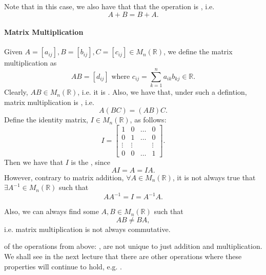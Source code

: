 \documentclass[notoc,notitlepage]{tufte-book}
\begin{document}
Note that in this case, we also have that that the operation is , i.e.
\begin{equation*}
  A + B = B + A.
\end{equation*}

\paragraph{Matrix Multiplication} Given $A = [a_{ij}], B = [b_{ij}], C = [c_{ij}] \in M_n(\mathbb{R})$, we define the matrix multiplication as
\begin{equation*}
  AB = [d_{ij}] \text{ where } c_{ij} = \sum_{k=1}^{n} a_{ik} b_{kj} \in \mathbb{R}.
\end{equation*}
Clearly, $AB \in M_n(\mathbb{R})$, i.e. it is . Also, we have that, under such a defintion, matrix multiplication is , i.e.
\begin{equation*}
  A(BC) = (AB)C.
\end{equation*}
Define the identity matrix, $I \in M_n(\mathbb{R})$, as follows:
\begin{equation*}
  I = \begin{bmatrix}
    1      &   0    & \hdots & 0 \\
    0      &   1    & \hdots & 0 \\
    \vdots & \vdots &        & \vdots \\
    0      &   0    & \hdots & 1
  \end{bmatrix}.
\end{equation*}
Then we have that $I$ is the , since
\begin{equation*}
  AI = A = IA.
\end{equation*}
However, contrary to matrix addition, $\forall A \in M_n(\mathbb{R})$, it is not always true that $\exists A^{-1} \in M_n(\mathbb{R})$ such that
\begin{equation*}
  AA^{-1} = I = A^{-1} A.
\end{equation*}

Also, we can always find some $A, B \in M_n(\mathbb{R})$ such that
\begin{equation*}
  AB \neq BA,
\end{equation*}
i.e. matrix multiplication is not always commutative.

 of the operations from above: , are not unique to just addition and multiplication. We shall see in the next lecture that there are other operations where these properties will continue to hold, e.g. .
\end{document}
